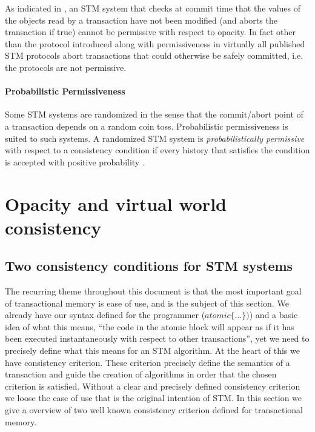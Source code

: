 As indicated in \cite{GHS08}, an STM system that checks at commit time that
the values of the objects read by a transaction have not been modified (and 
aborts the transaction if true) cannot be permissive  with respect to opacity. 
In fact other than the protocol introduced along with permissiveness in \cite{GHS08}
virtually all published STM protocols abort transactions that could
otherwise be safely committed, i.e. the protocols are not permissive.


\paragraph{Probabilistic Permissiveness}
Some STM systems are randomized in the sense that the commit/abort point of
a transaction depends on  a random coin toss. Probabilistic permissiveness is
suited to  such systems. A  randomized STM system is  {\it probabilistically
permissive} with respect to a  consistency condition if every history that
satisfies the condition is accepted with positive probability \cite{GHS08}. 




\section{Opacity and virtual world consistency}
\label{sec:opacity-and-VWC}

\subsection{Two consistency conditions  for STM systems}

The recurring theme throughout this document is that
the most important goal of transactional memory is ease of use,
and is the subject of this section.
We already have our syntax defined for the programmer ($atomic\{ \dots \})$) and
a basic idea of what this means, ``the code in the atomic block will appear as if
it has been executed instantaneously with respect to other transactions'', yet we need to precisely define what this
means for an STM algorithm.
At the heart of this we have consistency criterion.
These criterion precisely define the semantics of a transaction and guide the creation
of algorithms in order that the chosen criterion is satisfied.
Without a clear and precisely defined consistency criterion we loose the ease of use
that is the original intention of STM.
In this section we give a overview of two well known consistency criterion
defined for transactional memory.


